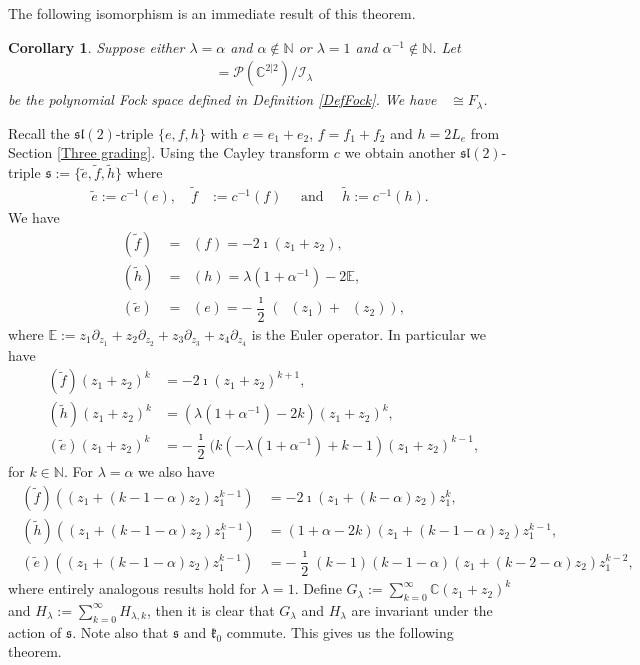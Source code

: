 \documentclass{amsart}
\numberwithin{theorem}{section}
\newtheorem{Cor}[theorem]{Corollary}
\theoremstyle{definition}
\theoremstyle{remark}
\def\E{\mathds{E} }
\def\N{\mathds{N} }
\def\C{\mathds{C} }
\DeclareMathOperator{\bessel}{\mathcal B_\lambda}
\DeclareMathOperator{\Fock}{\mc F_\lambda}
\newcommand{\pt}[1]{\partial_{#1}}
\newcommand{\mf}[1]{\mathfrak{#1}}
\newcommand{\mc}[1]{\mathcal{#1}}
\DeclareMathOperator{\pil}{\pi_\lambda}
\DeclareMathOperator{\rol}{\rho_\lambda}
\begin{document}
The following isomorphism is an immediate result of this theorem.

\begin{Cor}
Suppose either $\lambda=\alpha$ and $\alpha\not\in \N$ or $\lambda=1$ and $\alpha^{-1}\not\in \N$. Let
\begin{align*}
\Fock = \mathcal{P}(\C^{2|2})/{\mc I_\lambda}
\end{align*}
be the polynomial Fock space defined in Definition \ref{DefFock}. We have $\Fock \cong F_\lambda$.
\end{Cor}

Recall the $\mf{sl}(2)$-triple $\{e,f,h\}$ with $e=e_1+e_2$, $f=f_1+f_2$ and $h=2L_e$ from Section \ref{Three grading}. Using the Cayley transform $c$ we obtain another $\mf{sl}(2)$-triple $\mf s :=\{\tilde e,\tilde f,\tilde h\}$ where 
\begin{align*}
\tilde e := c^{-1}(e), \quad \tilde f &:= c^{-1}(f) \quad \mbox{ and } \quad \tilde h := c^{-1}(h).
\end{align*}
We have
\begin{align*}
\rol(\tilde f) &= \pil(f) = -2\imath ({z_1}+{z_2}),\\
\rol(\tilde h) &= \pil(h) = \lambda(1+\alpha^{-1})-2\E,\\
\rol(\tilde e) &= \pil(e) = -\dfrac{\imath}{2}(\bessel({z_1})+\bessel({z_2})),
\end{align*}
where $\E := {z_1}\pt {z_1} + {z_2}\pt {z_2} + {z_3}\pt{z_3} +{z_4} \pt {z_4}$ is the Euler operator. In particular we have
\begin{align*}
\rol(\tilde f)({z_1}+{z_2})^k &= -2\imath({z_1}+{z_2})^{k+1},\\
\rol(\tilde h)({z_1}+{z_2})^k &= (\lambda(1+\alpha^{-1})-2k)({z_1}+{z_2})^k,\\
\rol(\tilde e)({z_1}+{z_2})^k &= -\dfrac{\imath}{2}(k(-\lambda(1+\alpha^{-1})+k-1)({z_1}+{z_2})^{k-1},
\end{align*}
for $k\in \N$. For $\lambda=\alpha$ we also have
\begin{align*}
\rol(\tilde f)(({z_1} + (k-1-\alpha){z_2})z_1^{k-1}) &= -2\imath({z_1}+(k-\alpha){z_2})z_1^{k},\\
\rol(\tilde h)(({z_1} + (k-1-\alpha){z_2})z_1^{k-1}) &= (1+\alpha-2k)({z_1} + (k-1-\alpha){z_2})z_1^{k-1},\\
\rol(\tilde e)(({z_1} + (k-1-\alpha){z_2})z_1^{k-1}) &= -\dfrac{\imath}{2}(k-1)(k-1-\alpha)({z_1} + (k-2-\alpha){z_2})z_1^{k-2},
\end{align*}
where entirely analogous results hold for $\lambda=1$.
Define $G_\lambda := \sum_{k=0}^\infty \C ({z_1}+{z_2})^k$ and $H_\lambda := \sum_{k=0}^\infty H_{\lambda,k}$, then it is clear that $G_\lambda$ and $H_\lambda$ are invariant under the action of $\mf s$. Note also that $\mf s$ and $\mf k_0$ commute. This gives us the following theorem.
\end{document}
